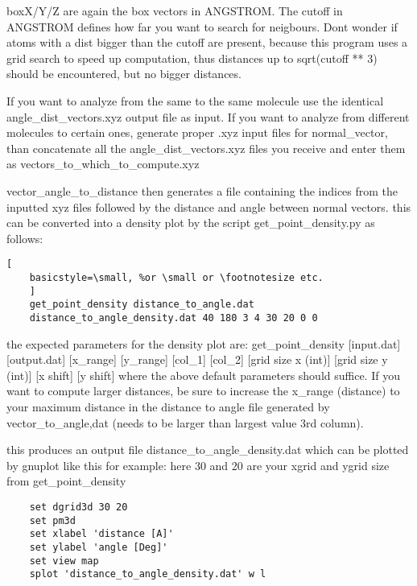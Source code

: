 \documentclass{article}
\begin{document}
	boxX/Y/Z are again the box vectors in ANGSTROM. The cutoff in ANGSTROM defines how far you want to search for neigbours. Dont wonder if atoms with a dist bigger than the cutoff are present, because this program uses a grid search to speed up computation, thus distances up to sqrt(cutoff ** 3) should be encountered, but no bigger distances.
	
	If you want to analyze from the same to the same molecule use the identical angle\_dist\_vectors.xyz output file as input.
	If you want to analyze from different molecules to certain ones, generate proper .xyz input files for normal\_vector, than concatenate all the angle\_dist\_vectors.xyz files you receive and enter them as vectors\_to\_which\_to\_compute.xyz
	
	vector\_angle\_to\_distance then generates a file containing the indices from the inputted xyz files followed by the distance and angle between normal vectors. this can be converted into a density plot by the script get\_point\_density.py as follows:
	
	\begin{lstlisting}[
	basicstyle=\small, %or \small or \footnotesize etc.
	]
	get_point_density distance_to_angle.dat 
	distance_to_angle_density.dat 40 180 3 4 30 20 0 0
	\end{lstlisting}
	
	the expected parameters for the density plot are:
	get\_point\_density [input.dat] [output.dat] [x\_range] [y\_range] [col\_1] [col\_2] [grid size x (int)] [grid size y (int)] [x shift] [y shift]
	where the above default parameters should suffice. If you want to compute larger distances, be sure to increase the x\_range (distance) to your maximum distance in the distance to angle file generated by vector\_to\_angle,dat (needs to be larger than largest value 3rd column).
	
	this produces an output file distance\_to\_angle\_density.dat which can be plotted by gnuplot like this for example:
	here 30 and 20 are your xgrid and ygrid size from get\_point\_density
	
	\begin{lstlisting}
	set dgrid3d 30 20
	set pm3d
	set xlabel 'distance [A]'
	set ylabel 'angle [Deg]'
	set view map
	splot 'distance_to_angle_density.dat' w l
	\end{lstlisting}
	
\end{document}
